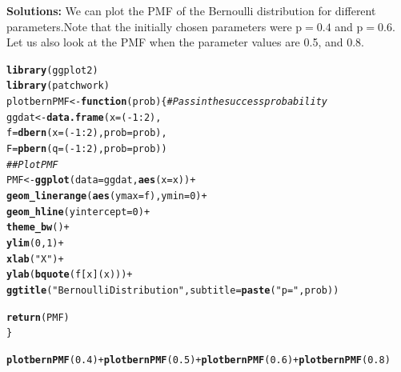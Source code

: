 \documentclass{article}\usepackage[]{graphicx}\usepackage[]{color}
\makeatletter
\newcommand{\hlnum}[1]{\textcolor[rgb]{0.686,0.059,0.569}{#1}}%
\newcommand{\hlstr}[1]{\textcolor[rgb]{0.192,0.494,0.8}{#1}}%
\newcommand{\hlcom}[1]{\textcolor[rgb]{0.678,0.584,0.686}{\textit{#1}}}%
\newcommand{\hlopt}[1]{\textcolor[rgb]{0,0,0}{#1}}%
\newcommand{\hlstd}[1]{\textcolor[rgb]{0.345,0.345,0.345}{#1}}%
\newcommand{\hlkwa}[1]{\textcolor[rgb]{0.161,0.373,0.58}{\textbf{#1}}}%
\newcommand{\hlkwb}[1]{\textcolor[rgb]{0.69,0.353,0.396}{#1}}%
\newcommand{\hlkwc}[1]{\textcolor[rgb]{0.333,0.667,0.333}{#1}}%
\newcommand{\hlkwd}[1]{\textcolor[rgb]{0.737,0.353,0.396}{\textbf{#1}}}%
\newenvironment{kframe}{%
 \def\at@end@of@kframe{}%
 \ifinner\ifhmode%
  \def\at@end@of@kframe{\end{minipage}}%
  \begin{minipage}{\columnwidth}%
 \fi\fi%
 \def\FrameCommand##1{\hskip\@totalleftmargin \hskip-\fboxsep
 \colorbox{shadecolor}{##1}\hskip-\fboxsep
     \hskip-\linewidth \hskip-\@totalleftmargin \hskip\columnwidth}%
 \MakeFramed {\advance\hsize-\width
   \@totalleftmargin\z@ \linewidth\hsize
   \@setminipage}}%
 {\par\unskip\endMakeFramed%
 \at@end@of@kframe}
\newenvironment{knitrout}{}{} %
\makeatother
\begin{document}
\begin{enumerate}
\begin{enumerate}
	\textbf{Solutions:} We can plot the PMF of the Bernoulli distribution for different parameters.Note that the initially chosen parameters were $\mathrm{p =0.4}$ and $\mathrm{p=0.6}$. Let us also look at the PMF when the parameter values are 0.5, and 0.8.
	
\begin{knitrout}
\color{fgcolor}\begin{kframe}
\begin{alltt}
\hlkwd{library}\hlstd{(ggplot2)}
\hlkwd{library}\hlstd{(patchwork)}
\hlstd{plotbernPMF} \hlkwb{<-} \hlkwa{function}\hlstd{(}\hlkwc{prob}\hlstd{)\{} \hlcom{# Pass in the success probability}
  \hlstd{ggdat} \hlkwb{<-} \hlkwd{data.frame}\hlstd{(}\hlkwc{x} \hlstd{= (}\hlopt{-}\hlnum{1}\hlopt{:}\hlnum{2}\hlstd{),}
                      \hlkwc{f} \hlstd{=} \hlkwd{dbern}\hlstd{(}\hlkwc{x} \hlstd{= (}\hlopt{-}\hlnum{1}\hlopt{:}\hlnum{2}\hlstd{),} \hlkwc{prob} \hlstd{= prob),}
                      \hlkwc{F} \hlstd{=} \hlkwd{pbern}\hlstd{(}\hlkwc{q} \hlstd{= (}\hlopt{-}\hlnum{1}\hlopt{:}\hlnum{2}\hlstd{),} \hlkwc{prob} \hlstd{= prob))}
  \hlcom{## Plot PMF}
  \hlstd{PMF} \hlkwb{<-} \hlkwd{ggplot}\hlstd{(}\hlkwc{data} \hlstd{= ggdat,} \hlkwd{aes}\hlstd{(}\hlkwc{x} \hlstd{= x))} \hlopt{+}
    \hlkwd{geom_linerange}\hlstd{(}\hlkwd{aes}\hlstd{(}\hlkwc{ymax} \hlstd{= f),} \hlkwc{ymin} \hlstd{=} \hlnum{0}\hlstd{)} \hlopt{+}
    \hlkwd{geom_hline}\hlstd{(}\hlkwc{yintercept} \hlstd{=} \hlnum{0}\hlstd{)} \hlopt{+}
    \hlkwd{theme_bw}\hlstd{()} \hlopt{+}
    \hlkwd{ylim}\hlstd{(}\hlnum{0}\hlstd{,} \hlnum{1}\hlstd{)} \hlopt{+}
    \hlkwd{xlab}\hlstd{(}\hlstr{"X"}\hlstd{)} \hlopt{+}
    \hlkwd{ylab}\hlstd{(}\hlkwd{bquote}\hlstd{(f[x](x)))} \hlopt{+}
    \hlkwd{ggtitle}\hlstd{(}\hlstr{"Bernoulli Distribution"}\hlstd{,}\hlkwc{subtitle} \hlstd{=} \hlkwd{paste}\hlstd{(}\hlstr{"p ="}\hlstd{, prob))}

  \hlkwd{return}\hlstd{(PMF)}
\hlstd{\}}

\hlkwd{plotbernPMF}\hlstd{(}\hlnum{0.4}\hlstd{)} \hlopt{+} \hlkwd{plotbernPMF}\hlstd{(}\hlnum{0.5}\hlstd{)} \hlopt{+} \hlkwd{plotbernPMF}\hlstd{(}\hlnum{0.6}\hlstd{)} \hlopt{+} \hlkwd{plotbernPMF}\hlstd{(}\hlnum{0.8}\hlstd{)}
\end{alltt}
\end{kframe}
\end{knitrout}


\end{enumerate}
\end{enumerate}
\end{document}
